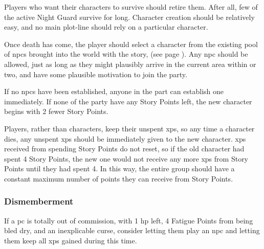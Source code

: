 \begin{multicols}{2}
Players who want their characters to survive should retire them.
After all, few of the active Night Guard survive for long.
Character creation should be relatively easy, and no main plot-line should rely on a particular character.

Once death has come, the player should select a character from the existing pool of \glspl{npc} brought into the world with the story,  (see page \pageref{oldnpc}).
Any \gls{npc} should be allowed, just as long as they might plausibly arrive in the current area within  or two, and have some plausible motivation to join the party.

If no \glspl{npc} have been established, anyone in the part can establish one immediately.
If none of the party have any Story Points left, the new character begins with 2 fewer Story Points.

Players, rather than characters, keep their unspent \glspl{xp}, so any time a character dies, any unspent \glspl{xp} should be immediately given to the new character.
\Glspl{xp} received from spending Story Points do not reset, so if the old character had spent 4 Story Points, the new one would not receive any more \glspl{xp} from Story Points until they had spent 4.
In this way, the entire group should have a constant maximum number of points they can receive from Story Points.

\subsubsection{Dismemberment}

If a \gls{pc} is totally out of commission, with 1 \gls{hp} left, 4 Fatigue Points from being bled dry, and an inexplicable curse, consider letting them play an \gls{npc} and letting them keep all \glspl{xp} gained during this time.

\end{multicols}
